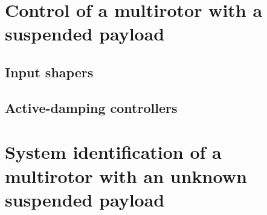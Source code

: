 {\section{Control of a multirotor with a suspended payload}

    \subsection{Input shapers}

    \subsection{Active-damping controllers}

    
 

\section{System identification of a multirotor with an unknown suspended payload}

   

}


